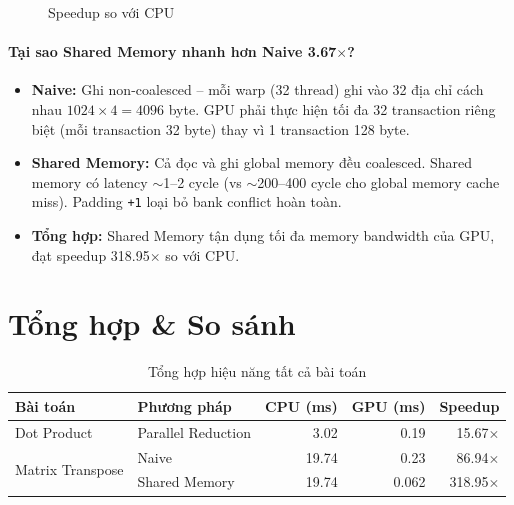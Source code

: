 \documentclass[12pt,a4paper]{article}
\begin{document}
\begin{figure}[H]
\centering
{}
\caption{Speedup so với CPU}
\end{figure}

\paragraph{Tại sao Shared Memory nhanh hơn Naive 3.67$\times$?}

\begin{itemize}[leftmargin=2em]
    \item \textbf{Naive:} Ghi non-coalesced -- mỗi warp (32 thread) ghi vào 32 địa chỉ cách nhau $1024 \times 4 = 4096$ byte. GPU phải thực hiện tối đa 32 transaction riêng biệt (mỗi transaction 32 byte) thay vì 1 transaction 128 byte.
    \item \textbf{Shared Memory:} Cả đọc và ghi global memory đều coalesced. Shared memory có latency $\sim$1--2 cycle (vs $\sim$200--400 cycle cho global memory cache miss). Padding \texttt{+1} loại bỏ bank conflict hoàn toàn.
    \item \textbf{Tổng hợp:} Shared Memory tận dụng tối đa memory bandwidth của GPU, đạt speedup 318.95$\times$ so với CPU.
\end{itemize}

\section{Tổng hợp \& So sánh}

\begin{table}[H]
\centering
\begin{tabular}{llrrr}
\toprule
\textbf{Bài toán} & \textbf{Phương pháp} & \textbf{CPU (ms)} & \textbf{GPU (ms)} & \textbf{Speedup} \\
\midrule
\multirow{1}{*}{Dot Product}     & Parallel Reduction & 3.02  & 0.19  & 15.67$\times$ \\
\midrule
\multirow{2}{*}{Matrix Transpose} & Naive              & 19.74 & 0.23  & 86.94$\times$ \\
                                   & Shared Memory      & 19.74 & 0.062 & 318.95$\times$ \\
\bottomrule
\end{tabular}
\caption{Tổng hợp hiệu năng tất cả bài toán}
\end{table}
\end{document}
